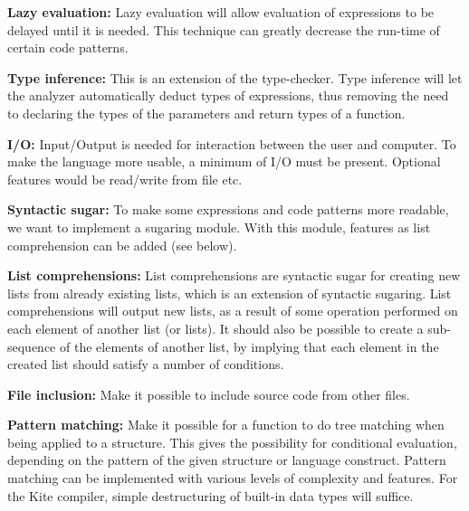 \textbf{Lazy evaluation:}
Lazy evaluation will allow evaluation of expressions to be delayed until it is needed. This technique can greatly decrease the run-time of certain code patterns.

\textbf{Type inference:}
This is an extension of the type-checker. Type inference will let the analyzer automatically deduct types of expressions, thus removing the need to declaring the types of the parameters and return types of a function.

\textbf{I/O:}
Input/Output is needed for interaction between the user and computer. To make the language more usable, a minimum of I/O must be present. Optional features would be read/write from file etc.

\textbf{Syntactic sugar:}
To make some expressions and code patterns more readable, we want to implement a sugaring module. With this module, features as list comprehension can be added (see below).

\textbf{List comprehensions:}
List comprehensions are syntactic sugar for creating new lists from already existing lists, which is an extension of syntactic sugaring. List comprehensions will output new lists, as a result of some operation performed on each element of another list (or lists). It should also be possible to create a sub-sequence of the elements of another list, by implying that each element in the created list should satisfy a number of conditions.

\textbf{File inclusion:}
Make it possible to include source code from other files.

\textbf{Pattern matching:}
Make it possible for a function to do tree matching when being applied to a structure. This gives the possibility for conditional evaluation, depending on the pattern of the given structure or language construct. Pattern matching can be implemented with various levels of complexity and features. For the Kite compiler, simple destructuring of built-in data types will suffice.